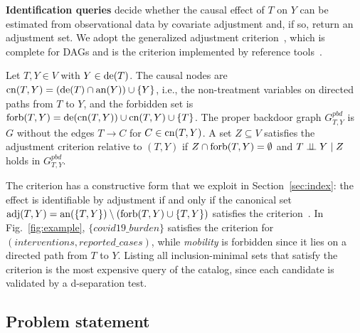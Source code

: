 \noindent\textbf{Identification queries} decide whether the causal effect of
$T$ on $Y$ can be estimated from observational data by covariate adjustment
and, if so, return an adjustment set. We adopt the generalized adjustment
criterion~\cite{shpitser2010validity,perkovic2018complete}, which is complete
for DAGs and is the criterion implemented by reference
tools~\cite{textor2016dagitty}.

\begin{definition}
Let $T, Y \in V$ with $Y \in \mathrm{de}(T)$. The causal nodes are
$\mathrm{cn}(T,Y) = (\mathrm{de}(T) \cap \mathrm{an}(Y)) \cup \{Y\}$, i.e., the non-treatment
variables on directed paths from $T$ to $Y$, and the forbidden set is
$\mathrm{forb}(T,Y) = \mathrm{de}(\mathrm{cn}(T,Y)) \cup \mathrm{cn}(T,Y) \cup \{T\}$. The proper backdoor
graph $G^{\mathit{pbd}}_{T,Y}$ is $G$ without the edges $T \rightarrow C$ for
$C \in \mathrm{cn}(T,Y)$. A set $Z \subseteq V$ satisfies the adjustment criterion
relative to $(T,Y)$ if $Z \cap \mathrm{forb}(T,Y) = \emptyset$ and
$T \perp\!\!\!\perp Y \mid Z$ holds in $G^{\mathit{pbd}}_{T,Y}$.
\end{definition}

The criterion has a constructive form that we exploit in
Section~\ref{sec:index}: the effect is identifiable by adjustment if and only
if the canonical set $\mathrm{adj}(T,Y) = \mathrm{an}(\{T,Y\}) \setminus (\mathrm{forb}(T,Y) \cup
\{T,Y\})$ satisfies the criterion~\cite{vanderzander2019separators}. In
Fig.~\ref{fig:example}, $\{\textit{covid19\_burden}\}$ satisfies the
criterion for $(\textit{interventions}, \textit{reported\_cases})$, while
\textit{mobility} is forbidden since it lies on a directed path from $T$ to
$Y$. Listing all inclusion-minimal sets that satisfy the criterion is the most
expensive query of the catalog, since each candidate is validated by a
d-separation test.

\subsection{Problem statement}\label{sec:bg:problem}

